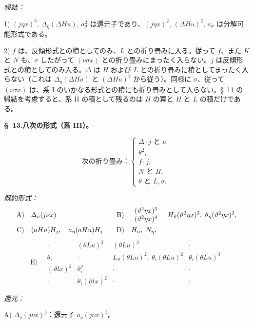 \documentclass[11pt]{article}
\newcommand{\A}{\Delta}
\begin{document}
\noindent\emph{帰結：}

1) $(j\eta x)^3$, $\A_\eta(\A Hu)$, $a_\sigma^2$ は還元子であり、$(j\eta x)^2$, $(\A Hu)^2$, $a_\sigma$ は分解可能形式である。

2) $f$ は、反傾形式との積としてのみ、$L$ との折り畳みに入る。従って $f$、また $K$ と $N$ も、$\sigma$ したがって $(\nu\sigma x)$ との折り畳みにまったく入らない。$j$ は反傾形式との積としてのみ入る。$\A$ は $H$ および $L$ との折り畳みに積としてまったく入らない（これは $\A_\eta(\A Hu)$ と $(\A Hu)^2$ から従う）。同様に $\sigma$、従って $(\nu\sigma x)$ は、系 I のいかなる形式との積にも折り畳みとして入らない。\S\ 11 の帰結を考慮すると、系 II の積として残るのは $H$ の冪と $H$ と $L$ の積だけである。

\begin{center}
\textbf{\S\ 13.\quad 八次の形式（系 III）。}
\end{center}
\[
\text{次の折り畳み：}\left\{\begin{array}{l}
\A\cdot j\text{ と }\nu,\\
\theta^2,\\
 f\cdot j,\\
 N\text{ と }H,\\
\theta\text{ と }L,\sigma.
\end{array}\right.
\]

\noindent\emph{既約形式：}
\[
\begin{array}{c@{\quad}l@{\qquad}c@{\quad}l}
\text{A)}&\A_\nu(j\nu x)&
\text{B)}&\begin{array}{c}(\vartheta^2\eta x)^3\\(\vartheta^2\eta x)^4\end{array}
\quad H_\vartheta(\vartheta^2\eta x)^3,
\ \theta_\eta(\vartheta^2\eta x)^3,\\[1em]
\text{C)}&(aHu)H_j,
\quad a_\eta(aHu)H_j&
\text{D)}&H_n,
\ N_\eta,
\end{array}
\]
\[
\text{E)}\quad
\begin{array}{c|c|c|c}
\cdot&(\theta Lu)^2&(\theta Lu)^3&\cdot\\
\theta_i&\cdot&L_\vartheta(\theta Lu)^2,
\ \theta_i(\theta Lu)^2&\theta_i(\theta Lu)^3\\
(\vartheta lx)^2&\theta_i^2&\cdot&\cdot\\
\cdot&\theta_i(\vartheta lx)^2&\cdot&\cdot
\end{array}
\]

\noindent\emph{還元：}

\noindent A) $\A_\nu(j\nu x)^3$：還元子 $a_\nu(j\nu x)^3$。
\end{document}
